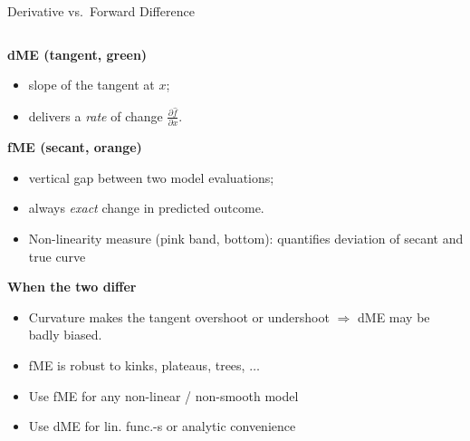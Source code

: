 \documentclass[10pt,compress,t,notes=noshow, xcolor=table]{beamer}
\begin{document}


\begin{frame}{Derivative vs.\ Forward Difference}

\begin{columns}[T,onlytextwidth]
\begin{column}{0.67\textwidth}
  \textbf{dME (tangent, green)}
        \begin{itemize}
            \item slope of the tangent at \(x\);
            \item delivers a \emph{rate} of change \(\tfrac{\partial\widehat f}{\partial x}\).
        \end{itemize}
  \textbf{fME (secant, orange)}
        \begin{itemize}
            \item vertical gap between two model evaluations;
            \item always \emph{exact} change in predicted outcome.
            \item Non-linearity measure (pink band, bottom): quantifies deviation of secant and true curve 
        \end{itemize}

  \textbf{When the two differ}
        \begin{itemize}
            \item Curvature makes the tangent overshoot or undershoot  
                  \(\Rightarrow\) dME may be badly biased.
            \item fME is robust to kinks, plateaus, trees, $\dots$
        \end{itemize}
{}
\begin{itemize}
    \item<2-> Use fME for any non-linear / non-smooth model
    \item<2-> Use dME for lin. func.-s or analytic convenience
\end{itemize}


\end{column}
\end{columns}
\end{frame}
\end{document}
